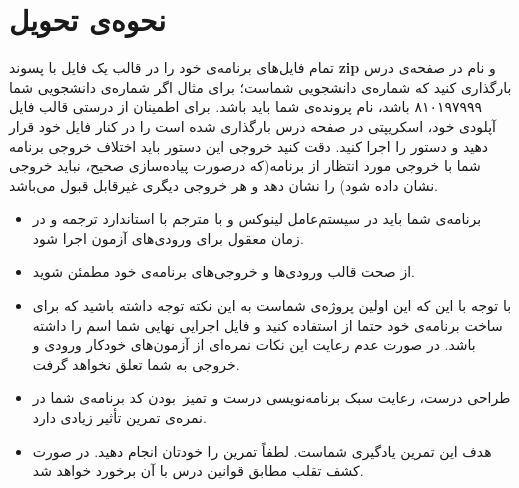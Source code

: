 \documentclass{utap}
\begin{document}
	\section{نحوه‌ی تحویل}
	\hspace{5mm}
	تمام فایل‌های برنامه‌ی خود را در قالب یک فایل با پسوند \textbf{zip} و نام  در صفحه‌ی  درس بارگذاری کنید که  شماره‌ی دانشجویی شماست؛ برای مثال اگر شماره‌ی دانشجویی شما ۸۱۰۱۹۷۹۹۹ باشد، نام پرونده‌ی شما باید  باشد. 
	\newline
	برای اطمینان از درستی قالب فایل آپلودی خود، اسکریپتی در صفحه درس بارگذاری شده است را در کنار فایل خود قرار دهید و دستور
	را اجرا کنید. دقت کنید خروجی این دستور باید اختلاف خروجی برنامه شما با خروجی مورد انتظار از برنامه(که درصورت پیاده‌سازی صحیح، نباید خروجی نشان داده شود) را نشان دهد و هر خروجی دیگری غیرقابل قبول می‌باشد.
	\begin{itemize}
		\item برنامه‌ی شما باید در سیستم‌عامل لینوکس و با مترجم  با استاندارد  ترجمه و در زمان معقول برای ورودی‌های آزمون اجرا شود.
		\item از صحت قالب ورودی‌ها و خروجی‌های برنامه‌ی خود مطمئن شوید.
		\item با توجه با این که این اولین پروژه‌ی  شماست به این نکته توجه داشته باشید که برای ساخت برنامه‌ی خود حتما از  استفاده کنید و فایل اجرایی نهایی شما اسم  را داشته باشد. در صورت عدم رعایت این نکات نمره‌ای از آزمون‌های خودکار ورودی و خروجی به شما تعلق نخواهد گرفت.
		\item طراحی درست، رعایت سبک برنامه‌نویسی درست و تمیز~بودن کد برنامه‌ی شما در نمره‌ی تمرین تأثیر زیادی دارد.
		\item هدف این تمرین یادگیری شماست. لطفاً تمرین را خودتان انجام دهید. در صورت کشف تقلب مطابق قوانین درس با آن برخورد خواهد شد.
	\end{itemize}
	
	
\end{document}
